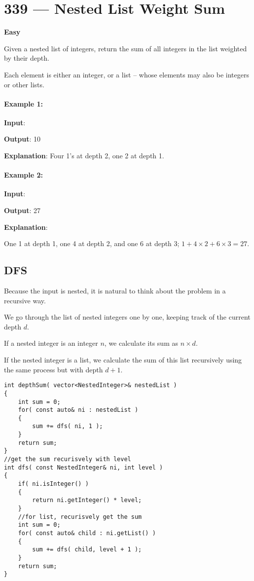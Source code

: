 \section{339 --- Nested List Weight Sum}

\textbf{Easy}

Given a nested list of integers, return the sum of all integers in the list weighted by their depth.

Each element is either an integer, or a list -- whose elements may also be integers or other lists.

\paragraph{Example 1:}

\begin{flushleft}
\textbf{Input}: \fcj{[[1,1],2,[1,1]]}

\textbf{Output}: 10 

\textbf{Explanation}: Four 1's at depth 2, one 2 at depth 1.
\end{flushleft}

\paragraph{Example 2:}

\begin{flushleft}
\textbf{Input}: 

\textbf{Output}: 27 

\textbf{Explanation}: 

One 1 at depth 1, one 4 at depth 2, and one 6 at depth 3; $1 + 4\times 2 + 6\times 3 = 27$.
\end{flushleft}

\subsection{DFS}
Because the input is nested, it is natural to think about the problem in a recursive way. 

We go through the list of nested integers one by one, keeping track of the current depth $d$. 

If a nested integer is an integer $n$, we calculate its sum as $n\times d$. 

If the nested integer is a list, we calculate the sum of this list recursively using the same process but with depth $d+1$.

\setcounter{lstlisting}{0}
\begin{lstlisting}[style=customc, caption={DFS}]
int depthSum( vector<NestedInteger>& nestedList )
{
    int sum = 0;
    for( const auto& ni : nestedList )
    {
        sum += dfs( ni, 1 );
    }
    return sum;
}
//get the sum recurisvely with level
int dfs( const NestedInteger& ni, int level )
{
    if( ni.isInteger() )
    {
        return ni.getInteger() * level;
    }
    //for list, recurisvely get the sum
    int sum = 0;
    for( const auto& child : ni.getList() )
    {
        sum += dfs( child, level + 1 );
    }
    return sum;
}
\end{lstlisting}

